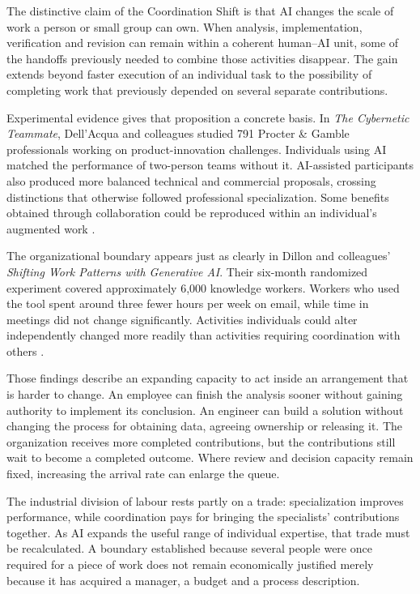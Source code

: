 \begin{EssayColumns}

The distinctive claim of the Coordination Shift is that AI changes the
scale of work a person or small group can own. When analysis,
implementation, verification and revision can remain within a coherent
human--AI unit, some of the handoffs previously needed to combine those
activities disappear. The gain extends beyond faster execution of an
individual task to the possibility of completing work that previously
depended on several separate contributions.

Experimental evidence gives that proposition a concrete basis. In
\emph{The Cybernetic Teammate}, Dell'Acqua and colleagues studied 791
Procter \& Gamble professionals working on product-innovation
challenges. Individuals using AI matched the performance of two-person
teams without it. AI-assisted participants also produced more balanced
technical and commercial proposals, crossing distinctions that otherwise
followed professional specialization. Some benefits obtained through
collaboration could be reproduced within an individual's augmented work
\citep{dellacqua2026teammate}.

The organizational boundary appears just as clearly in Dillon and
colleagues' \emph{Shifting Work Patterns with Generative AI}. Their
six-month randomized experiment covered approximately 6,000 knowledge
workers. Workers who used the tool spent around three fewer hours per
week on email, while time in meetings did not change significantly.
Activities individuals could alter independently changed more readily
than activities requiring coordination with others
\citep{dillon2025workpatterns}.

\NextEssayColumn

Those findings describe an expanding capacity to act inside an
arrangement that is harder to change. An employee can finish the
analysis sooner without gaining authority to implement its conclusion.
An engineer can build a solution without changing the process for
obtaining data, agreeing ownership or releasing it. The organization
receives more completed contributions, but the contributions still wait
to become a completed outcome. Where review and decision capacity remain
fixed, increasing the arrival rate can enlarge the queue.

The industrial division of labour rests partly on a trade:
specialization improves performance, while coordination pays for
bringing the specialists' contributions together. As AI expands the
useful range of individual expertise, that trade must be recalculated. A
boundary established because several people were once required for a
piece of work does not remain economically justified merely because it
has acquired a manager, a budget and a process description.


\end{EssayColumns}
